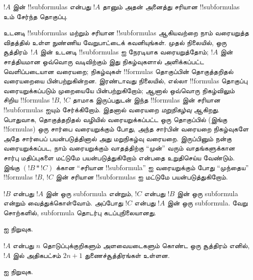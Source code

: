 \documentclass[../../../include/open-logic-section]{subfiles}
\begin{document}
\begin{defn}[!!^{subformula}]
$!A$ இன் !!{subformula}s என்பது $!A$ தானும் அதன் அனைத்து சரியான
!!{subformula}s உம் சேர்ந்த தொகுப்பு.
\end{defn}

\begin{explain}
உடனடி !!{subformula}s மற்றும் சரியான !!{subformula}s ஆகியவற்றை நாம்
வரையறுத்த விதத்தில் உள்ள நுண்ணிய வேறுபாட்டைக் கவனியுங்கள். முதல் நிலையில்,
ஒரு சூத்திரம்~$!A$ இன் உடனடி !!{subformula}s ஐ நேரடியாக வரையறுத்தோம்;
$!A$ இன் சாத்தியமான ஒவ்வொரு வடிவிற்கும் இது நிகழ்வுகளால் அளிக்கப்பட்ட வெளிப்படையான
வரையறை; நிகழ்வுகள் !!{formula}s தொகுப்பின் தொகுத்தறிதல் வரையறையை
பின்பற்றுகின்றன. இரண்டாவது நிலையில், எல்லா !!{formula}s தொகுப்பு
வரையறுக்கப்படும் முறையையே பின்பற்றுகிறோம்; ஆனால் ஒவ்வொரு நிகழ்விலும்
சிறிய !!{formula}s $!B$, $!C$ தாமாக இருப்பதுடன் இந்த !!{formula}s இன்
சரியான !!{subformula}s ஐயும் சேர்க்கிறோம். இதனால் வரையறை
\emph{மறுநிகழ்வு} ஆகிறது. பொதுவாக, தொகுத்தறிதல் வழியில் வரையறுக்கப்பட்ட
ஒரு தொகுப்பில் (இங்கு !!{formula}s) ஒரு சார்பை வரையறுக்கும் போது, அந்த
சார்பின் வரையறை நிகழ்வுகளே அதே சார்பைப் பயன்படுத்தினால் அது மறுநிகழ்வு
வரையறை. இருப்பினும் நன்கு வரையறுக்கப்பட, நாம் வரையறுக்கும் வாதத்திற்கு
``முன்'' வரும் வாதங்களுக்கான சார்பு மதிப்புகளை மட்டுமே பயன்படுத்துகிறோம்
என்பதை உறுதிசெய்ய வேண்டும். இங்கு $(!B \ast !C)$ க்கான ``சரியான
!!{subformula}'' ஐ வரையறுக்கும் போது ``முந்தைய'' !!{formula}s $!B$, $!C$
இன் சரியான !!{subformula}s ஐ மட்டுமே பயன்படுத்துகிறோம்.
\end{explain}

\begin{prop}
$!B$ என்பது $!A$ இன் ஒரு subformula என்றும், $!C$ என்பது $!B$ இன் ஒரு
subformula என்றும் வைத்துக்கொள்வோம். அப்போது $!C$ என்பது $!A$ இன் ஒரு
subformula. வேறு சொற்களில், subformula தொடர்பு கடப்புநிலையானது.
\end{prop}

\begin{prob}
 ஐ நிறுவுக.
\end{prob}

\begin{prop}
$!A$ என்பது $n$ தொடுப்புக்குறிகளும் அளவையடைகளும் கொண்ட ஒரு சூத்திரம் எனில்,
$!A$ இல் அதிகபட்சம் $2n+1$ துணைச்சூத்திரங்கள் உள்ளன.
\end{prop}

\begin{prob}
 ஐ நிறுவுக.
\end{prob}
\end{document}
